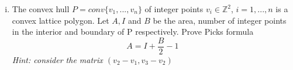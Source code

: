 \documentclass[11pt,a4paper]{article}
\begin{document}
\begin{enumerate}[i)]
\item The convex hull $P = conv\{v_1,...,v_n\}$ of integer points $v_i ∈ \mathbb{Z}^2$, $i = 1,...,n$ is a convex lattice polygon. Let $A,I$ and $B$ be the area, number of
integer points in the interior and boundary of P respectively. Prove Picks formula
$$A = I +\frac{B}{2}−1$$
\textit{Hint: consider the matrix $(v_2 - v_1, v_3- v_2)$}


  

    
\end{enumerate} 


%
%


 
\end{document}
